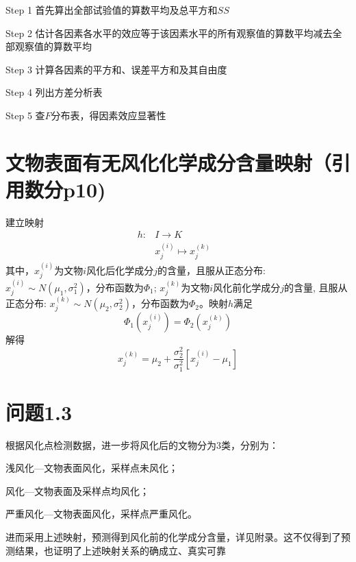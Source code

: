 Step 1 首先算出全部试验值的算数平均及总平方和$\mathit{SS}$

Step 2
估计各因素各水平的效应等于该因素水平的所有观察值的算数平均减去全部观察值的算数平均

Step 3 计算各因素的平方和、误差平方和及其自由度

Step 4 列出方差分析表

Step 5 查$F分布表$，得因素效应显著性

\section{文物表面有无风化化学成分含量映射（引用数分p10)}

建立映射
\begin{eqnarray*}
  h : & I \rightarrow K & \\
  & x_j^{(i)} \mapsto x_j^{(k)} &
\end{eqnarray*}
其中，$x_j^{(i)}$为文物$i$风化后化学成分$j$的含量，且服从正态分布:
$x_j^{(i)} \sim N (\mu_1, \sigma^2_1) ，分布函数为 \Phi_1$;
$x_j^{(k)}$为文物$i$风化前化学成分$j$的含量,
且服从正态分布: $x_j^{(k)} \sim N (\mu_2, \sigma^2_2)
，分布函数为 \Phi_2$。映射$h$满足
\[ \Phi_1 (x_j^{(i)}) = \Phi_2 (x_j^{(k)}) \]
解得
\[ x_j^{(k)} = \mu_2 + \frac{\sigma^2_2}{\sigma^2_1} [x_j^{(i)} - \mu_1] \]

\section{问题1.3} %
\label{sec:问题1_3}


根据风化点检测数据，进一步将风化后的文物分为3类，分别为：

浅风化—文物表面风化，采样点未风化；

风化—文物表面及采样点均风化；

严重风化—文物表面风化，采样点严重风化。

进而采用上述映射，预测得到风化前的化学成分含量，详见附录。这不仅得到了预测结果，也证明了上述映射关系的确成立、真实可靠
